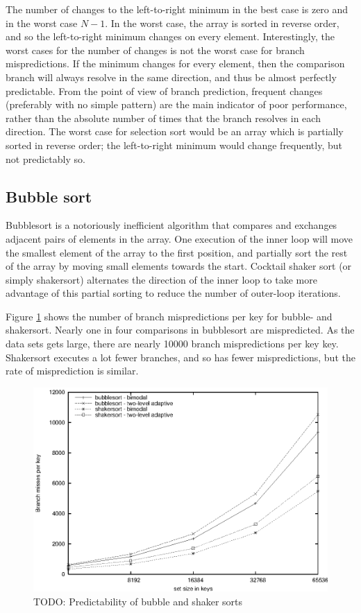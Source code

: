 \documentclass[acmtocl]{acmtrans2m}
\begin{document}
The number of changes to the left-to-right minimum in the best case is
zero and in the worst case $N-1$. In the worst case, the array is
sorted in reverse order, and so the left-to-right minimum changes on
every element. Interestingly, the worst cases for the number of
changes is not the worst case for branch mispredictions. If the
minimum changes for every element, then the comparison branch will
always resolve in the same direction, and thus be almost perfectly
predictable. From the point of view of branch prediction, frequent
changes (preferably with no simple pattern) are the main indicator of
poor performance, rather than the absolute number of times that the
branch resolves in each direction. The worst case for selection sort
would be an array which is partially sorted in reverse order; the
left-to-right minimum would change frequently, but not predictably so.

\subsection{Bubble sort}
Bubblesort is a notoriously inefficient algorithm that compares and
exchanges adjacent pairs of elements in the array. One execution of
the inner loop will move the smallest element of the array to the
first position, and partially sort the rest of the array by moving
small elements towards the start. Cocktail shaker sort (or simply
shakersort) alternates the direction of the inner loop to take
more advantage of this partial sorting to reduce the number of
outer-loop iterations.

Figure \ref{Predictability-of-bubblesort-and-shakersort} shows the number of branch mispredictions per key for
bubble- and shakersort.  Nearly one in four comparisons in bubblesort
are mispredicted. As the data sets gets large, there are nearly 10000
branch mispredictions per key key. Shakersort executes a lot fewer
branches, and so has fewer mispredictions, but the rate of
misprediction is similar.

\begin{figure}[h]
\includegraphics[]{plots/bpred_misses_bubble_shaker.eps}
\caption{TODO: Predictability of bubble and shaker sorts}
\label{Predictability-of-bubblesort-and-shakersort}
\end{figure}
\end{document}

